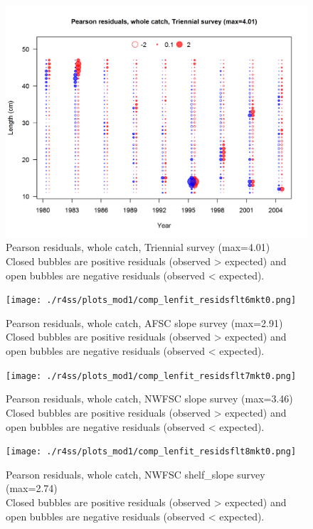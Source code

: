 \documentclass[12pt,]{article}
\begin{document}
\begin{figure}
\centering
\includegraphics{./r4ss/plots_mod1/comp_lenfit_residsflt5mkt0.png}
\caption{Pearson residuals, whole catch, Triennial survey (max=4.01)\\
Closed bubbles are positive residuals (observed \textgreater{} expected)
and open bubbles are negative residuals (observed \textless{} expected).
\label{fig:tri_len_pearson}}
\end{figure}

\begin{figure}
\centering
\texttt{[image: ./r4ss/plots\_mod1/comp\_lenfit\_residsflt6mkt0.png]}
\caption{Pearson residuals, whole catch, AFSC slope survey (max=2.91)\\
Closed bubbles are positive residuals (observed \textgreater{} expected)
and open bubbles are negative residuals (observed \textless{} expected).
\label{fig:afsc_len_pearson}}
\end{figure}

\begin{figure}
\centering
\texttt{[image: ./r4ss/plots\_mod1/comp\_lenfit\_residsflt7mkt0.png]}
\caption{Pearson residuals, whole catch, NWFSC slope survey (max=3.46)\\
Closed bubbles are positive residuals (observed \textgreater{} expected)
and open bubbles are negative residuals (observed \textless{} expected).
\label{fig:nwfsc_len_pearson}}
\end{figure}

\begin{figure}
\centering
\texttt{[image: ./r4ss/plots\_mod1/comp\_lenfit\_residsflt8mkt0.png]}
\caption{Pearson residuals, whole catch, NWFSC shelf\_slope survey
(max=2.74)\\
Closed bubbles are positive residuals (observed \textgreater{} expected)
and open bubbles are negative residuals (observed \textless{} expected).
\label{fig:nwfsc_combo_len_pearson}}
\end{figure}
\end{document}
